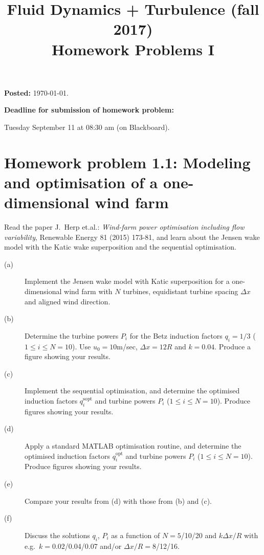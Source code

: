 \documentclass[a4paper, 10pt]{article}
\title{Fluid Dynamics + Turbulence (fall 2017) \\ Homework Problems I}
\author{}
\date{}
\begin{document}
\maketitle

\large{
\textbf{Posted:}
\today.

\bigskip
\textbf{Deadline for submission of homework problem:}

Tuesday September 11 at 08:30 am (on Blackboard).
}

\bigskip




\section[Homework problem 1]{Homework problem 1.1: Modeling and optimisation of a one-dimensional wind farm}

Read the paper J.\ Herp et.al.: {\it Wind-farm power optimisation including flow variability}, Renewable Energy 81 (2015) 173-81, and learn about the Jensen wake model with the Katic wake superposition and the sequential optimisation.

\begin{description}
\item[(a)]
Implement the Jensen wake model with Katic superposition for a one-dimensional wind farm with $N$ turbines, equidistant turbine spacing $\Delta{x}$ and aligned wind direction.

\item[(b)]
Determine the turbine powers $P_i$ for the Betz induction factors $q_i=1/3$ ($1\leq i\leq N=10$). Use $u_0=10$m/sec, $\Delta{x}=12R$ and $k=0.04$. Produce a figure showing your results.

\item[(c)]
Implement the sequential optimisation, and determine the optimised induction factors $q_i^\mathrm{sopt}$ and turbine powers $P_i$ ($1\leq i\leq N=10$). Produce figures showing your results.

\item[(d)]
Apply a standard MATLAB optimisation routine, and determine the optimised induction factors $q_i^\mathrm{opt}$ and turbine powers $P_i$ ($1\leq i\leq N=10$). Produce figures showing your results.

\item[(e)]
Compare your results from (d) with those from (b) and (c).

\item[(f)]
Discuss the solutions $q_i$, $P_i$ as a function of $N=5$/10/20 and $k\Delta{x}/R$ with e.g.\ $k=0.02$/0.04/0.07 and/or $\Delta{x}/R=8$/12/16.
\end{description}
\end{document}
